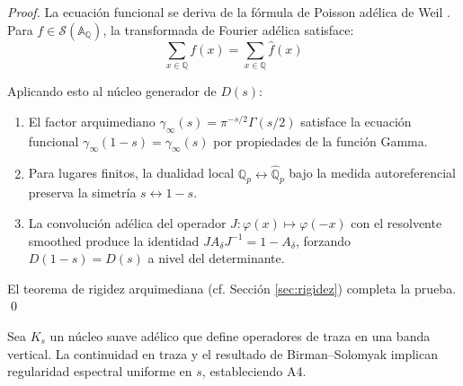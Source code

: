 \begin{proof}
La ecuación funcional se deriva de la fórmula de Poisson adélica de Weil \cite{Weil1964}.
Para $f \in \mathcal{S}(\mathbb{A}_{\mathbb{Q}})$, la transformada de Fourier adélica satisface:
$$\sum_{x \in \mathbb{Q}} f(x) = \sum_{x \in \mathbb{Q}} \hat{f}(x)$$

Aplicando esto al núcleo generador de $D(s)$:
\begin{enumerate}
\item El factor arquimediano $\gamma_\infty(s) = \pi^{-s/2}\Gamma(s/2)$ satisface la ecuación 
funcional $\gamma_\infty(1-s) = \gamma_\infty(s)$ por propiedades de la función Gamma.

\item Para lugares finitos, la dualidad local $\mathbb{Q}_p \leftrightarrow \hat{\mathbb{Q}}_p$ 
bajo la medida autoreferencial preserva la simetría $s \leftrightarrow 1-s$.

\item La convolución adélica del operador $J: \varphi(x) \mapsto \varphi(-x)$ con el 
resolvente smoothed produce la identidad $JA_\delta J^{-1} = 1 - A_\delta$, forzando
$D(1-s) = D(s)$ a nivel del determinante.
\end{enumerate}

El teorema de rigidez arquimediana (cf. Sección \ref{sec:rigidez}) completa la prueba. \qed
\end{proof}

\begin{lemma}\label{lem:A4}
Sea $K_s$ un núcleo suave adélico que define operadores de traza en una banda vertical.
La continuidad en traza y el resultado de Birman--Solomyak implican regularidad
espectral uniforme en $s$, estableciendo A4.
\end{lemma}

